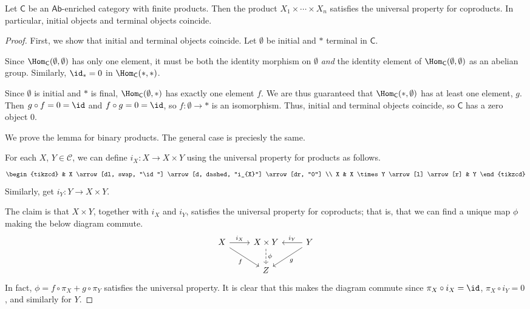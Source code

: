 \documentclass[main.tex]{subfiles}
\begin{document}
\begin{lemma}
  \label{lemma:abeliancategorycoproductsareproducts}
  Let $\mathsf{C}$ be an $\mathsf{Ab}$-enriched category with finite products. Then the product $X_{1} \times \cdots \times X_{n}$ satisfies the universal property for coproducts. In particular, initial objects and terminal objects coincide.
\end{lemma}
\begin{proof}
  First, we show that initial and terminal objects coincide. Let $\emptyset$ be initial and $*$ terminal in $\mathsf{C}$.

  Since $\Hom_{\mathsf{C}}(\emptyset, \emptyset)$ has only one element, it must be both the identity morphism on $\emptyset$ \emph{and} the identity element of $\Hom_{\mathsf{C}}(\emptyset, \emptyset)$ as an abelian group. Similarly, $\id_{*} = 0$ in $\Hom_{\mathsf{C}}(*, *)$.

  Since $\emptyset$ is initial and $*$ is final, $\Hom_{\mathsf{C}}(\emptyset, *)$ has exactly one element $f$. We are thus guaranteed that $\Hom_{\mathsf{C}}(*, \emptyset)$ has at least one element, $g$. Then $g \circ f = 0 = \id$ and $f \circ g = 0 = \id$, so $f\colon \emptyset \to *$ is an isomorphism. Thus, initial and terminal objects coincide, so $\mathsf{C}$ has a zero object $0$.

  We prove the lemma for binary products. The general case is preciesly the same.

  For each $X$, $Y \in \mathcal{C}$, we can define $i_{X}\colon X \to X \times Y$ using the universal property for products as follows.
  \begin{equation*}
    \begin{tikzcd}
      & X
      \arrow[dl, swap, "\id"]
      \arrow[d, dashed, "i_{X}"]
      \arrow[dr, "0"]
      \\
      X
      & X \times Y
      \arrow[l]
      \arrow[r]
      & Y
    \end{tikzcd}
  \end{equation*}
  Similarly, get $i_{Y}\colon Y \to X \times Y$.

  The claim is that $X \times Y$, together with $i_{X}$ and $i_{Y}$, satisfies the universal property for coproducts; that is, that we can find a unique map $\phi$ making the below diagram commute.
  \begin{equation*}
    \begin{tikzcd}
      X
      \arrow[r, "i_{X}"]
      \arrow[dr, swap, "f"]
      & X \times Y
      \arrow[d, dashed, "\phi"]
      & Y
      \arrow[l, swap, "i_{Y}"]
      \arrow[dl, "g"]
      \\
      & Z
    \end{tikzcd}
  \end{equation*}
  In fact, $\phi = f \circ \pi_{X} + g \circ \pi_{Y}$ satisfies the universal property. It is clear that this makes the diagram commute since $\pi_{X} \circ i_{X} = \id$, $\pi_{X} \circ i_{Y} = 0$, and similarly for $Y$.


\end{proof}
\end{document}

